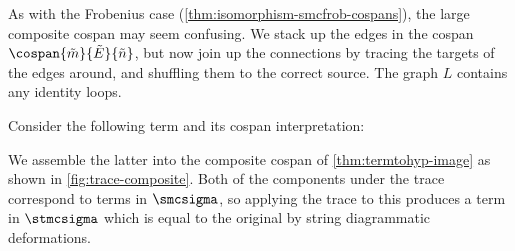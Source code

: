 As with the Frobenius case
(\cref{thm:isomorphism-smcfrob-cospans}), the large composite cospan may seem
confusing.
We stack up the edges in the cospan
\(\cospan{\tilde{m}}{\tilde{E}}{\tilde{n}}\), but now join up the connections
by tracing the targets of the edges around, and shuffling them to the correct
source.
The graph \(L\) contains any identity loops.

\begin{example}\label{ex:trace-composite}
    Consider the following term and its cospan interpretation:
    \begin{center}
        \quad
    \end{center}
    We assemble the latter into the composite cospan of
    \cref{thm:termtohyp-image} as shown in \cref{fig:trace-composite}.
    Both of the components under the trace correspond to terms in \(\smcsigma\),
    so applying the trace to this produces a term in \(\stmcsigma\) which is
    equal to the original by string diagrammatic deformations.
    \begin{center}
    \end{center}
\end{example}

